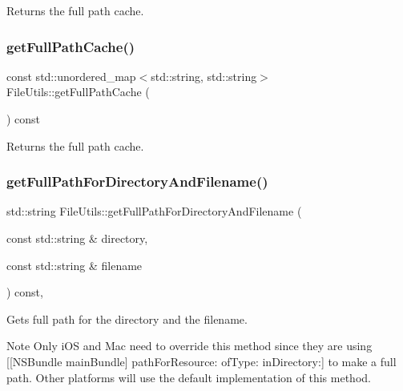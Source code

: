 Returns the full path cache. \mbox{\label{classFileUtils_af5c339ef609f73c83a94518340871142}} 
\subsubsection{\texorpdfstring{get\+Full\+Path\+Cache()}{getFullPathCache()}\hspace{0.1cm}{\footnotesize\ttfamily [2/2]}}
{\footnotesize\ttfamily const std\+::unordered\+\_\+map$<$std\+::string, std\+::string$>$ File\+Utils\+::get\+Full\+Path\+Cache (\begin{DoxyParamCaption}{ }\end{DoxyParamCaption}) const\hspace{0.3cm}{\ttfamily [inline]}}

Returns the full path cache. \mbox{\label{classFileUtils_a543d684dc27fc7d02fbe387271d92c12}} 
\subsubsection{\texorpdfstring{get\+Full\+Path\+For\+Directory\+And\+Filename()}{getFullPathForDirectoryAndFilename()}}
{\footnotesize\ttfamily std\+::string File\+Utils\+::get\+Full\+Path\+For\+Directory\+And\+Filename (\begin{DoxyParamCaption}\item[{const std\+::string \&}]{directory,  }\item[{const std\+::string \&}]{filename }\end{DoxyParamCaption}) const\hspace{0.3cm}{\ttfamily [protected]}, {\ttfamily [virtual]}}

Gets full path for the directory and the filename.

\begin{DoxyNote}{Note}
Only i\+OS and Mac need to override this method since they are using {\ttfamily \mbox{[}\mbox{[}N\+S\+Bundle main\+Bundle\mbox{]} path\+For\+Resource\+: of\+Type\+: in\+Directory\+:\mbox{]}} to make a full path. Other platforms will use the default implementation of this method. 
\end{DoxyNote}

